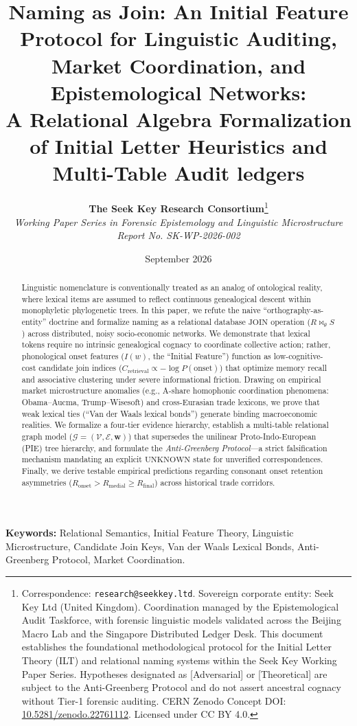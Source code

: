 \documentclass[11pt,a4paper]{article}
\title{\textbf{Naming as Join: An Initial Feature Protocol for Linguistic Auditing, Market Coordination, and Epistemological Networks: \\ \large A Relational Algebra Formalization of Initial Letter Heuristics and Multi-Table Audit ledgers}}
\author{
    \textbf{The Seek Key Research Consortium}\thanks{Correspondence: \texttt{research@seekkey.ltd}. Sovereign corporate entity: Seek Key Ltd (United Kingdom). Coordination managed by the Epistemological Audit Taskforce, with forensic linguistic models validated across the Beijing Macro Lab and the Singapore Distributed Ledger Desk. This document establishes the foundational methodological protocol for the Initial Letter Theory (ILT) and relational naming systems within the Seek Key Working Paper Series. Hypotheses designated as [Adversarial] or [Theoretical] are subject to the Anti-Greenberg Protocol and do not assert ancestral cognacy without Tier-1 forensic auditing. CERN Zenodo Concept DOI: \href{https://doi.org/10.5281/zenodo.22761112}{10.5281/zenodo.22761112}. Licensed under CC BY 4.0.} \\
    \textit{Working Paper Series in Forensic Epistemology and Linguistic Microstructure} \\
    \textit{Report No. SK-WP-2026-002}
}
\date{September 2026}
\begin{document}
\maketitle

\begin{abstract}
Linguistic nomenclature is conventionally treated as an analog of ontological reality, where lexical items are assumed to reflect continuous genealogical descent within monophyletic phylogenetic trees. In this paper, we refute the naive ``orthography-as-entity'' doctrine and formalize naming as a relational database $\text{JOIN}$ operation ($R \bowtie_{\theta} S$) across distributed, noisy socio-economic networks. We demonstrate that lexical tokens require no intrinsic genealogical cognacy to coordinate collective action; rather, phonological onset features ($I(w)$, the ``Initial Feature'') function as low-cognitive-cost candidate join indices ($C_{\text{retrieval}} \propto -\log P(\text{onset})$) that optimize memory recall and associative clustering under severe informational friction. Drawing on empirical market microstructure anomalies (e.g., A-share homophonic coordination phenomena: Obama--Aucma, Trump--Wisesoft) and cross-Eurasian trade lexicons, we prove that weak lexical ties (``Van der Waals lexical bonds'') generate binding macroeconomic realities. We formalize a four-tier evidence hierarchy, establish a multi-table relational graph model ($\mathcal{G} = (\mathcal{V}, \mathcal{E}, \mathbf{w})$) that supersedes the unilinear Proto-Indo-European (PIE) tree hierarchy, and formulate the \textit{Anti-Greenberg Protocol}—a strict falsification mechanism mandating an explicit $\text{UNKNOWN}$ state for unverified correspondences. Finally, we derive testable empirical predictions regarding consonant onset retention asymmetries ($R_{\text{onset}} > R_{\text{medial}} \ge R_{\text{final}}$) across historical trade corridors.
\end{abstract}

\vspace{0.5em}
\noindent \textbf{Keywords:} Relational Semantics, Initial Feature Theory, Linguistic Microstructure, Candidate Join Keys, Van der Waals Lexical Bonds, Anti-Greenberg Protocol, Market Coordination.
\end{document}
